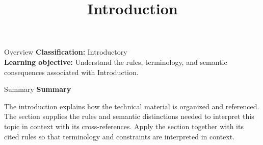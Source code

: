 \documentclass[10pt,letterpaper]{article}
\title{Introduction}
\author{}
\date{}
\begin{document}
\maketitle
\begin{CornellOverviewBox}{Overview}
\textbf{Classification:} Introductory\\[2pt]
\textbf{Learning objective:} Understand the rules, terminology, and semantic consequences associated with Introduction.
\end{CornellOverviewBox}\begin{CornellSummaryBox}{Summary}
{\sffamily\bfseries\color{Accent} Summary}\par\vspace{3pt}The introduction explains how the technical material is organized and referenced. The section supplies the rules and semantic distinctions needed to interpret this topic in context with its cross-references. Apply the section together with its cited rules so that terminology and constraints are interpreted in context.
\end{CornellSummaryBox}
\end{document}
